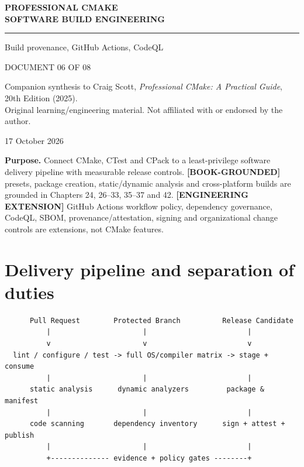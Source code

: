 \documentclass[11pt,letterpaper,oneside]{report}
\begin{document}
\hypersetup{pageanchor=false}\begin{titlepage}
\color{navy}
\vspace*{1.15in}
{\Large\bfseries PROFESSIONAL CMAKE\\[7pt]SOFTWARE BUILD ENGINEERING\par}
\vspace{0.32in}\noindent\textcolor{teal}{\rule{0.9\linewidth}{2.3pt}}\par
\vspace{0.45in}
\par
\vspace{0.3in}
{\Large\color{teal}Build provenance, GitHub Actions, CodeQL\par}
\vfill
{\large DOCUMENT 06 OF 08\par}
\vspace{0.1in}
{\small Companion synthesis to Craig Scott, \emph{Professional CMake: A Practical Guide}, 20th Edition (2025).\\
Original learning/engineering material. Not affiliated with or endorsed by the author.\par}
\vspace{0.2in}
{\small 17 October 2026\par}
\end{titlepage}
\hypersetup{pageanchor=true}\clearpage{}\tableofcontents\clearpage{}

\textbf{Purpose.} Connect CMake, CTest and CPack to a least-privilege
software delivery pipeline with measurable release controls.
\textbf{{[}BOOK-GROUNDED{]}} presets, package creation, static/dynamic
analysis and cross-platform builds are grounded in Chapters 24, 26--33,
35--37 and 42. \textbf{{[}ENGINEERING EXTENSION{]}} GitHub Actions
workflow policy, dependency governance, CodeQL, SBOM,
provenance/attestation, signing and organizational change controls are
extensions, not CMake features.

\chapter{Delivery pipeline and separation of
duties}\label{delivery-pipeline-and-separation-of-duties}

\begin{lstlisting}
      Pull Request        Protected Branch          Release Candidate
          |                      |                        |
          v                      v                        v
  lint / configure / test -> full OS/compiler matrix -> stage + consume
          |                      |                        |
      static analysis      dynamic analyzers         package & manifest
          |                      |                        |
      code scanning       dependency inventory      sign + attest + publish
          |                      |                        |
          +-------------- evidence + policy gates --------+
\end{lstlisting}
\end{document}
